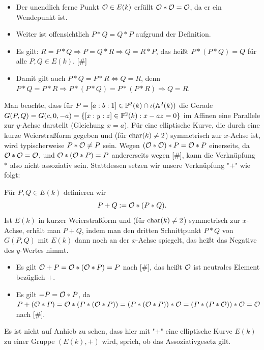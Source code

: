 \begin{bem}
	\begin{itemize}
		\item Der unendlich ferne Punkt $\mathcal{O} \in E(k)$ erfüllt $\mathcal{O} * \mathcal{O} = \mathcal{O}$, da er ein Wendepunkt ist.
		\item Weiter ist offensichtlich $P * Q = Q * P$ aufgrund der Definition.
		\item Es gilt: $R = P * Q \Rightarrow P = Q * R \Rightarrow Q = R * P$, das heißt $P * (P * Q) = Q$ für alle $P,Q \in E(k)$. \hfill [\#]
		\item Damit gilt auch $P * Q = P * R \Leftrightarrow Q = R$, denn $P * Q = P * R \Rightarrow P*(P*Q)=P*(P*R) \Rightarrow Q=R$.
	\end{itemize}
\end{bem}

\begin{bem}
	Man beachte, dass für $P = [a:b:1] \in \mathbb{P}^2(k) \cap \iota(\mathbb{A}^2(k))$ die Gerade $G(P,Q) = G(c,0,-a) = \{ [x:y:z] \in \mathbb{P}^2(k) : x - az = 0\}$ im Affinen eine Parallele zur $y$-Achse darstellt (Gleichung $x = a$). Für eine elliptische Kurve, die durch eine kurze Weierstraßform gegeben und (für $\operatorname{char}(k) \neq 2$) symmetrisch zur $x$-Achse ist, wird typischerweise $P * \mathcal{O} \neq P$ sein. Wegen $(\mathcal{O} * \mathcal{O}) * P = \mathcal{O} * P$ einerseits, da $\mathcal{O} * \mathcal{O} = \mathcal{O}$, und $\mathcal{O} * (\mathcal{O} * P) = P$ andererseits wegen [\#], kann die Verknüpfung $*$ also nicht assoziativ sein. Stattdessen setzen wir unsere Verknüpfung "$+$" wie folgt:
\end{bem}

\begin{defn}
	Für $P,Q \in E(k)$ definieren wir
	\[P + Q := \mathcal{O} *(P * Q). \]
	Ist $E(k)$ in kurzer Weierstraßform und (für $\operatorname{char}(k) \neq 2$) symmetrisch zur $x$-Achse, erhält man $P+Q$, indem man den dritten Schnittpunkt $P*Q$ von $G(P,Q)$ mit $E(k)$ dann noch an der $x$-Achse spiegelt, das heißt das Negative des $y$-Wertes nimmt.
\end{defn}

\begin{bem}
\label{bem_13.8}
	\begin{itemize}
		\item Es gilt $\mathcal{O} + P = \mathcal{O} * (\mathcal{O} * P) = P$ nach [\#], das heißt $\mathcal{O}$ ist neutrales Element bezüglich $+$.
		\item Es gilt $-P = \mathcal{O} * P$, da $P + (\mathcal{O} * P) = \mathcal{O} * (P * (\mathcal{O} * P)) = (P * (\mathcal{O} * P)) * \mathcal{O} = (P * (P * \mathcal{O})) * \mathcal{O} = \mathcal{O}$ nach [\#].
	\end{itemize}
\end{bem}
Es ist nicht auf Anhieb zu sehen, dass hier mit "$+$" eine elliptische Kurve $E(k)$ zu einer Gruppe $(E(k),+)$ wird, sprich, ob das Assoziativgesetz gilt.

